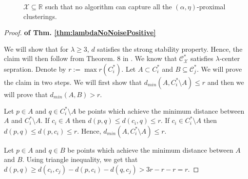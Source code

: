 \documentclass[anon,12pt]{colt2016} %
\newcommand{\mc}{\mathcal}
\begin{document}
\begin{figure}

\caption{$\mc X \subseteq \mathbb{R}$ such that no algorithm can capture all the $(\alpha, \eta)$-proximal clusterings.}
\label{fig:noalgalphacp}
\end{figure}

\begin{proof}\textbf{ of Thm. \ref{thm:lambdaNoNoisePositive}}

We will show that for $\lambda \ge 3$, $d$ satisfies the strong stability property. Hence, the claim will then follow from Theorem. 8 in \cite{balcan2008discriminative}. We know that $\mc C_{\mc X}^*$ satisfies $\lambda$-center sepration. Denote by $r := \max r(C_i^*)$. Let $A \subset C_i^*$ and $B \subseteq \mc C_j^*$. We will prove the claim in two steps. We will first show that $d_{min}(A, C_i^*\setminus A) \le r$ and then we will prove that $d_{min}(A, B) > r$.

Let $p \in A$ and $q \in C_i^* \setminus A$ be points which achieve the minimum distance between $A$ and $C_i^*\setminus A$. If $c_i \in A$ then $d(p, q) \le d(c_i, q) \le r$. If $c_i \in C_i^* \setminus A$ then $d(p, q) \le d(p, c_i) \le r$. Hence, $d_{min} (A, C_i^*\setminus A) \le r$.

Let $p \in A$ and $q \in B$ be points which achieve the minimum distance between $A$ and $B$. Using triangle inequality, we get that $d(p, q) \ge d(c_i, c_j) - d(p, c_i) - d(q, c_j) > 3r - r - r = r$.
\end{proof}
\end{document}
